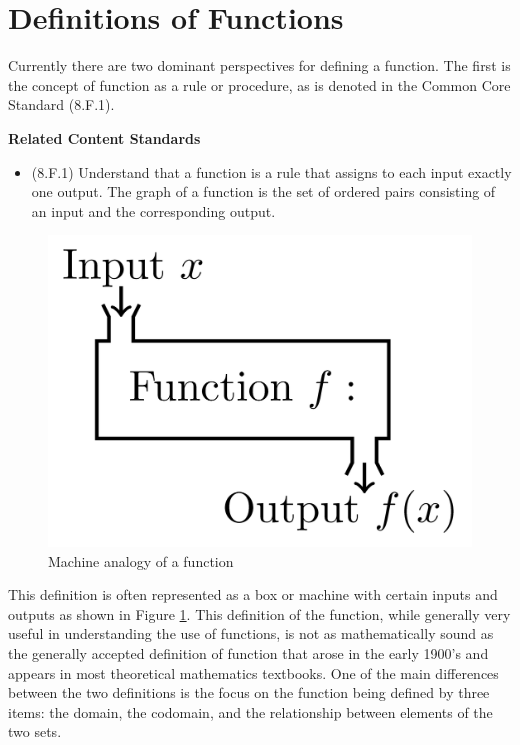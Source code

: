 \documentclass[
]{book}
\providecommand{\tightlist}{%
  \setlength{\itemsep}{0pt}\setlength{\parskip}{0pt}}
\newenvironment{standards}{}{}
\theoremstyle{definition}
\theoremstyle{definition}
\theoremstyle{definition}
\theoremstyle{definition}
\theoremstyle{remark}
\begin{document}
\hypertarget{Function-Def}{%
\section{Definitions of Functions}\label{Function-Def}}

Currently there are two dominant perspectives for defining a function. The first is the concept of function as a rule or procedure, as is denoted in the Common Core Standard (8.F.1).

\begin{standards}

\begin{center}
\textbf{Related Content Standards}

\end{center}

\begin{itemize}
\tightlist
\item
  (8.F.1) Understand that a function is a rule that assigns to each input exactly one output. The graph of a function is the set of ordered pairs consisting of an input and the corresponding output.
\end{itemize}

\end{standards}

\begin{figure}

{\centering \includegraphics[width=0.4\linewidth]{tikz/function-machine} 

}

\caption{Machine analogy of a function}\label{fig:machine}
\end{figure}

This definition is often represented as a box or machine with certain inputs and outputs as shown in Figure \ref{fig:machine}. This definition of the function, while generally very useful in understanding the use of functions, is not as mathematically sound as the generally accepted definition of function that arose in the early 1900's and appears in most theoretical mathematics textbooks. One of the main differences between the two definitions is the focus on the function being defined by three items: the domain, the codomain, and the relationship between elements of the two sets.
\end{document}
